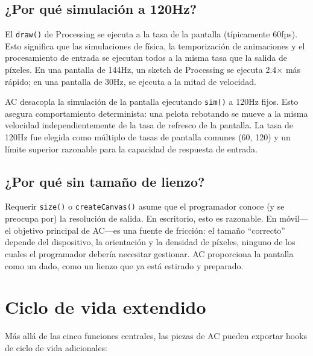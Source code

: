 \documentclass[10pt,letterpaper,twocolumn]{article}
\begin{document}
\subsection{¿Por qué simulación a 120Hz?}

El \texttt{draw()} de Processing se ejecuta a la tasa de la pantalla (típicamente 60fps). Esto significa que las simulaciones de física, la temporización de animaciones y el procesamiento de entrada se ejecutan todos a la misma tasa que la salida de píxeles. En una pantalla de 144Hz, un sketch de Processing se ejecuta 2.4$\times$ más rápido; en una pantalla de 30Hz, se ejecuta a la mitad de velocidad.

AC desacopla la simulación de la pantalla ejecutando \texttt{sim()} a 120Hz fijos. Esto asegura comportamiento determinista: una pelota rebotando se mueve a la misma velocidad independientemente de la tasa de refresco de la pantalla. La tasa de 120Hz fue elegida como múltiplo de tasas de pantalla comunes (60, 120) y un límite superior razonable para la capacidad de respuesta de entrada.

\subsection{¿Por qué sin tamaño de lienzo?}

Requerir \texttt{size()} o \texttt{createCanvas()} asume que el programador conoce (y se preocupa por) la resolución de salida. En escritorio, esto es razonable. En móvil---el objetivo principal de AC---es una fuente de fricción: el tamaño ``correcto'' depende del dispositivo, la orientación y la densidad de píxeles, ninguno de los cuales el programador debería necesitar gestionar. AC proporciona la pantalla como un dado, como un lienzo que ya está estirado y preparado.


\section{Ciclo de vida extendido}
\label{sec:extended}

Más allá de las cinco funciones centrales, las piezas de AC pueden exportar hooks de ciclo de vida adicionales:
\end{document}
